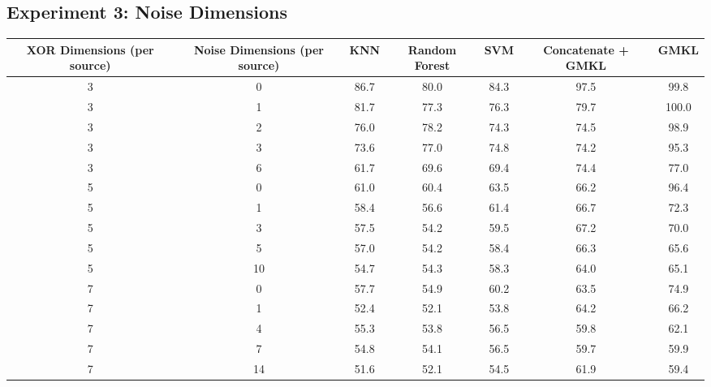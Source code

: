 \documentclass{article}
\begin{document}
\subsection*{Experiment 3: Noise Dimensions}

\begin{minipage}{\textwidth}
\centering
\begin{tabular}{|c| c| c| c| c| c| c|}
\hline
XOR Dimensions (per source) & Noise Dimensions  (per source) & KNN & Random Forest & SVM & Concatenate + GMKL & GMKL \\
\hline
3 & 0 & 86.7 & 80.0 & 84.3 & 97.5 & 99.8 \\
\hline
3 & 1 & 81.7 & 77.3 & 76.3 & 79.7 & 100.0 \\
\hline
3 & 2 & 76.0 & 78.2 & 74.3 & 74.5 & 98.9 \\
\hline
3 & 3 & 73.6 & 77.0 & 74.8 & 74.2 & 95.3 \\
\hline
3 & 6 & 61.7 & 69.6 & 69.4 & 74.4 & 77.0 \\
\hline
5 & 0 & 61.0 & 60.4 & 63.5 & 66.2 & 96.4 \\
\hline
5 & 1 & 58.4 & 56.6 & 61.4 & 66.7 & 72.3 \\
\hline
5 & 3 & 57.5 & 54.2 & 59.5 & 67.2 & 70.0 \\
\hline
5 & 5 & 57.0 & 54.2 & 58.4 & 66.3 & 65.6 \\
\hline
5 & 10 & 54.7 & 54.3 & 58.3 & 64.0 & 65.1 \\
\hline
7 & 0 & 57.7 & 54.9 & 60.2 & 63.5 & 74.9 \\
\hline
7 & 1 & 52.4 & 52.1 & 53.8 & 64.2 & 66.2 \\
\hline
7 & 4 & 55.3 & 53.8 & 56.5 & 59.8 & 62.1 \\
\hline
7 & 7 & 54.8 & 54.1 & 56.5 & 59.7 & 59.9 \\
\hline
7 & 14 & 51.6 & 52.1 & 54.5 & 61.9 & 59.4 \\
\hline
\end{tabular}
\end{minipage}












\end{document}
